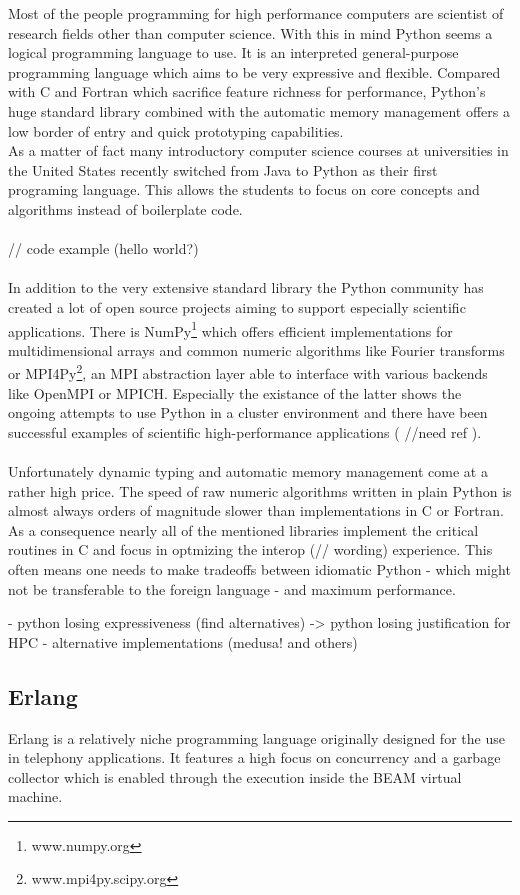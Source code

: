 Most of the people programming for high performance computers are scientist of research fields other than computer science. With this in mind Python seems a logical programming language to use. It is an interpreted general-purpose programming language which aims to be very expressive and flexible. Compared with C and Fortran which sacrifice feature richness for performance, Python's huge standard library combined with the automatic memory management offers a low border of entry and quick prototyping capabilities. \\
As a matter of fact many introductory computer science courses at universities in the United States recently switched from Java to Python as their first programing language.\autocite{GUO14} This allows the students to focus on core concepts and algorithms instead of boilerplate code.
\\ \\
// code example (hello world?)
\\ \\
In addition to the very extensive standard library the Python community has created a lot of open source projects aiming to support especially scientific applications. There is NumPy\footnote{www.numpy.org} which offers efficient implementations for multidimensional arrays and common numeric algorithms like Fourier transforms or MPI4Py\footnote{www.mpi4py.scipy.org}, an MPI abstraction layer able to interface with various backends like OpenMPI or MPICH. Especially the existance of the latter shows the ongoing attempts to use Python in a cluster environment and there have been successful examples of scientific high-performance applications ( //need ref ).
\\ \\
Unfortunately dynamic typing and automatic memory management come at a rather high price. The speed of raw numeric algorithms written in plain Python is almost always orders of magnitude slower than implementations in C or Fortran. As a consequence nearly all of the mentioned libraries implement the critical routines in C and focus in optmizing the interop (// wording) experience. This often means one needs to make tradeoffs between idiomatic Python - which might not be transferable to the foreign language - and maximum performance.

- python losing expressiveness (find alternatives) -> python losing justification for HPC
- alternative implementations (medusa! and others)

\subsection*{Erlang}
\label{ssec:Candidates.Erlang}
Erlang is a relatively niche programming language originally designed for the use in telephony applications. It features a high focus on concurrency and a garbage collector which is enabled through the execution inside the BEAM virtual machine.

